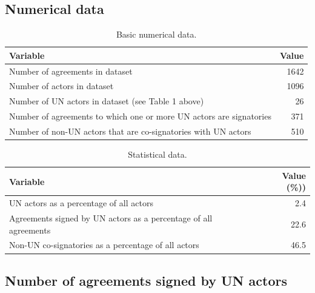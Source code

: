 \documentclass{article}
\begin{document}
\subsection{Numerical data}

\begin{table}[H]
\begin{center}
\small
\begin{tabularx}{\textwidth}{|X|r|}
    \hline
    \textbf{Variable} & \textbf{Value} \\
    \hline
    \hline
     Number of agreements in dataset & 1642 \\
     \hline
     Number of actors in dataset & 1096 \\
     \hline
     Number of UN actors in dataset (see Table 1 above) & 26 \\
     \hline
     Number of agreements to which one or more UN actors are signatories & 371 \\
     \hline
     Number of non-UN actors that are co-signatories with UN actors  & 510  \\
     \hline
\end{tabularx}
\end{center}
\normalsize
\caption{Basic numerical data.}
\end{table}

\begin{table}[H]
\begin{center}
\small
\begin{tabularx}{\textwidth}{|X|r|}
    \hline
    \textbf{Variable} & \textbf{Value (\%))} \\
    \hline
    \hline
     UN actors as a percentage of all actors  & 2.4  \\
     \hline
     Agreements signed by UN actors as a percentage of all agreements  & 22.6  \\
     \hline
     Non-UN co-signatories as a percentage of all actors & 46.5  \\
     \hline
\end{tabularx}
\end{center}
\normalsize
\caption{Statistical data.}
\end{table}

\subsection{Number of agreements signed by UN actors}
\end{document}
